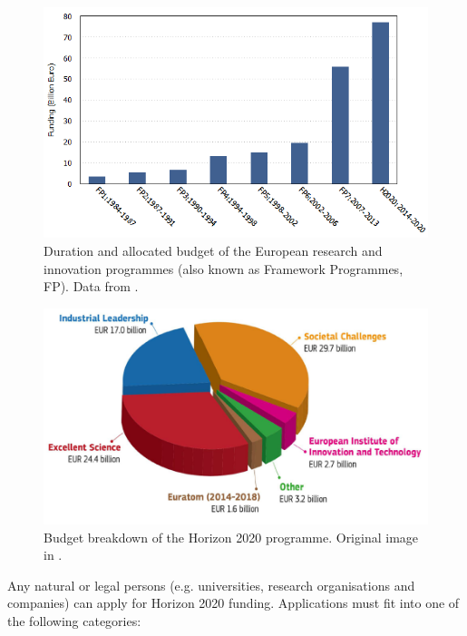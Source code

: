 \begin{figure}[!t] 
 \begin{center}
 \includegraphics[scale=0.5]{Images/FP_funds.png}
 \caption{Duration and allocated budget of the European research and innovation programmes (also known as Framework Programmes, FP). Data from \cite{FPBudget}.}
 \label{FP_funds}
 \end{center}
\end{figure}

\begin{figure}[!t] 
 \begin{center}
 \includegraphics[scale=0.43]{Images/H2020_budget_breakdown.png}
 \caption{Budget breakdown of the Horizon 2020 programme. Original image in \cite{H2020Budget}.}
 \label{H2020_budget_breakdown}
 \end{center}
\end{figure}

Any natural or legal persons (e.g. universities, research organisations and companies) can apply for Horizon 2020 funding. Applications must fit into one of the following categories: 

